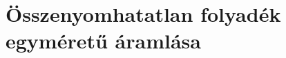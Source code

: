 \documentclass[11pt, a4paper]{report}
\begin{document}


















\chapter{Összenyomhatatlan folyadék egyméretű áramlása}













\end{document}
